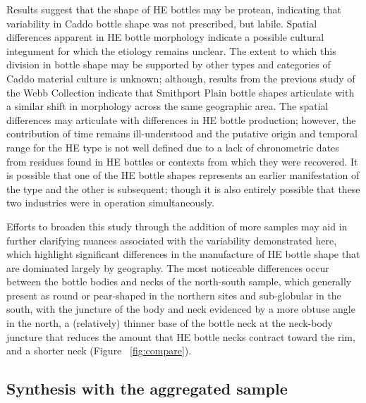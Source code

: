 \documentclass[review]{elsarticle}
\begin{document}
Results suggest that the shape of HE bottles may be protean, indicating that variability in Caddo bottle shape was not prescribed, but labile. Spatial differences apparent in HE bottle morphology indicate a possible cultural integument for which the etiology remains unclear. The extent to which this division in bottle shape may be supported by other types and categories of Caddo material culture is unknown; although, results from the previous study of the Webb Collection indicate that Smithport Plain bottle shapes articulate with a similar shift in morphology across the same geographic area. The spatial differences may articulate with differences in HE bottle production; however, the contribution of time remains ill-understood and the putative origin and temporal range for the HE type is not well defined due to a lack of chronometric dates from residues found in HE bottles or contexts from which they were recovered. It is possible that one of the HE bottle shapes represents an earlier manifestation of the type and the other is subsequent; though it is also entirely possible that these two industries were in operation simultaneously.

Efforts to broaden this study through the addition of more samples may aid in further clarifying nuances associated with the variability demonstrated here, which highlight significant differences in the manufacture of HE bottle shape that are dominated largely by geography. The most noticeable differences occur between the bottle bodies and necks of the north-south sample, which generally present as round or pear-shaped in the northern sites and sub-globular in the south, with the juncture of the body and neck evidenced by a more obtuse angle in the north, a (relatively) thinner base of the bottle neck at the neck-body juncture that reduces the amount that HE bottle necks contract toward the rim, and a shorter neck (Figure ~\ref{fig:compare}).

\subsection{Synthesis with the aggregated sample}
\end{document}
